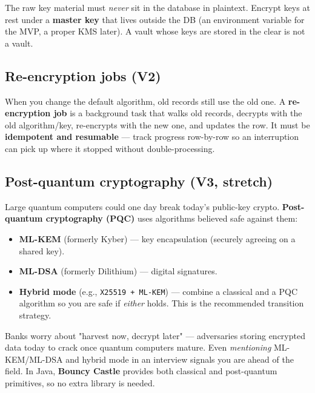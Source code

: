 \documentclass[11pt,a4paper]{article}
\begin{document}
\begin{pitfall}
The raw key material must \emph{never} sit in the database in plaintext. Encrypt keys at rest under
a \textbf{master key} that lives outside the DB (an environment variable for the MVP, a proper KMS
later). A vault whose keys are stored in the clear is not a vault.
\end{pitfall}

\subsection{Re-encryption jobs (V2)}

When you change the default algorithm, old records still use the old one. A \textbf{re-encryption
job} is a background task that walks old records, decrypts with the old algorithm/key, re-encrypts
with the new one, and updates the row. It must be \textbf{idempotent and resumable} — track
progress row-by-row so an interruption can pick up where it stopped without double-processing.

\subsection{Post-quantum cryptography (V3, stretch)}

Large quantum computers could one day break today's public-key crypto. \textbf{Post-quantum
cryptography (PQC)} uses algorithms believed safe against them:
\begin{itemize}[leftmargin=*]
  \item \textbf{ML-KEM} (formerly Kyber) — key encapsulation (securely agreeing on a shared key).
  \item \textbf{ML-DSA} (formerly Dilithium) — digital signatures.
  \item \textbf{Hybrid mode} (e.g., \texttt{X25519 + ML-KEM}) — combine a classical and a PQC
        algorithm so you are safe if \emph{either} holds. This is the recommended transition strategy.
\end{itemize}

\begin{whymatters}
Banks worry about "harvest now, decrypt later" — adversaries storing encrypted data today to crack
once quantum computers mature. Even \emph{mentioning} ML-KEM/ML-DSA and hybrid mode in an interview
signals you are ahead of the field. In Java, \textbf{Bouncy Castle} provides both classical and
post-quantum primitives, so no extra library is needed.
\end{whymatters}
\end{document}
